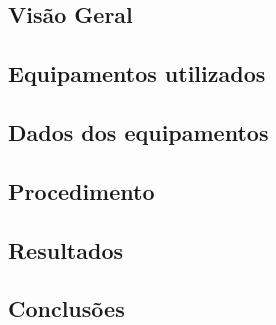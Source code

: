 \subsection{Visão Geral}
\subsection{Equipamentos utilizados}
\subsection{Dados dos equipamentos}
\subsection{Procedimento}
\subsection{Resultados} 
\subsection{Conclusões}
